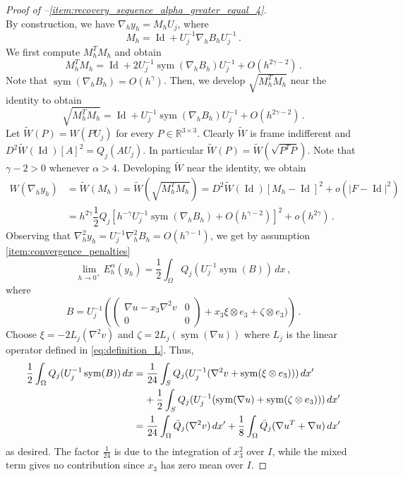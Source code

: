 \documentclass{article}
\theoremstyle{plain}
\theoremstyle{plain}
\theoremstyle{plain}
\theoremstyle{plain}
\theoremstyle{plain}
\theoremstyle{definition}
\theoremstyle{definition}
\renewcommand{\r}{\mathbb{R}}
\DeclareMathOperator{\Id}{Id}
\DeclareMathOperator{\sym}{sym}
\begin{document}
\begin{proof}[Proof of --\ref{item:recovery_sequence_alpha_greater_equal_4}]
\[    \]
    By construction, we have $\nabla_h y_h = M_hU_j$, where
    \[
        M_h =  \Id + U_j^{-1}\nabla_hB_hU_j^{-1} \,.
    \]
    We first compute $M^T_hM_h$ and obtain
    \begin{equation}
        M^T_hM_h = \Id + 2U_j^{-1} \sym(\nabla_h B_h) U_j^{-1}+ O(h^{2\gamma -2}) \,. \label{eq:product_Mh}
    \end{equation}
    Note that $\sym(\nabla_h B_h) = O(h^\gamma)$. Then, we develop $\sqrt{M^T_hM_h}$ near the identity to obtain
    \[
        \sqrt{M_h^TM_h} = \Id + U_j^{-1}\sym(\nabla_h B_h) U_j^{-1} + O(h^{2\gamma - 2}) \,.
    \]
    Let $\tilde W(P) = W(PU_j)$ for every $P \in \r^{3 \times 3}$. Clearly $\tilde W$ is frame indifferent and $D^2 \tilde W(\Id)[A]^2 = Q_j(AU_j)$. In particular $\tilde W(P) = \tilde W(\sqrt{P^TP})$. Note that $\gamma - 2 > 0$ whenever $\alpha > 4$. Developing $\tilde W$ near the identity, we obtain
    \begin{align}
        W(\nabla_h y_h) & = \tilde W(M_h) = \tilde W\left(\sqrt{M_h^TM_h}\right) = D^2\tilde W(\Id)[M_h-\Id]^2 + o(|F-\Id|^2)\\
        & = h^{2\gamma}\dfrac{1}{2}Q_j{\left[h^{-\gamma}U_j^{-1}\sym(\nabla_h B_h) + O(h^{\gamma - 2})\right]}^2+ o(h^{2\gamma}) \,.
    \end{align}
    Observing that $\nabla_h^2 y_h = U_j^{-1}\nabla_h^2 B_h = O(h^{\gamma-1})$, we get by assumption \ref{item:convergence_penalties}
    \[
        \lim_{h \to 0^+} E_h^\alpha(y_h) = \dfrac{1}{2}\int_\Omega Q_j(U_j^{-1}\sym(B)) \, dx \,,
    \]
    where
    \[
        B = U_j^{-1}\left(\begin{pmatrix}
            \nabla u - x_3\nabla^2 v & 0\\
            0 & 0
        \end{pmatrix} + x_3\xi \otimes e_3 + \zeta \otimes e_3)\right) \,.
    \]
    Choose $\xi = -2L_j(\nabla^2 v)$ and $\zeta = 2L_j(\sym(\nabla u))$ where $L_j$ is the linear operator defined in \eqref{eq:definition_L}. Thus,
    \begin{align}
        \dfrac{1}{2}\int_\Omega Q_j(U_j^{-1}\sym(B)) \, dx & = \dfrac{1}{24}\int_S Q_j(U_j^{-1}(\nabla^2v + \sym(\xi \otimes e_3))) \, dx' \\
        & \hphantom{=} \, \, + \dfrac{1}{2}\int_S Q_j(U_j^{-1}(\sym(\nabla u) + \sym(\zeta \otimes e_3))) \, dx' \\
        & = \dfrac{1}{24}\int_\Omega \bar Q_j(\nabla^2 v) \, dx' + \dfrac{1}{8}\int_\Omega \bar Q_j(\nabla u^T + \nabla u) \, dx'
    \end{align}
    as desired. The factor $\frac{1}{24}$ is due to the integration of $x_3^2$ over $I$, while the mixed term gives no contribution since $x_3$ has zero mean over $I$.
    

\end{proof}
\end{document}
